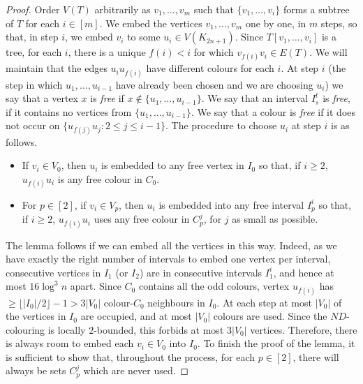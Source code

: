 \documentclass{article}
\theoremstyle{definition}
\begin{document}
\begin{proof}
Order $V(T)$ arbitrarily as $v_1, \dots, v_{m}$ such that $\{v_1, \dots, v_i\}$ forms a subtree of $T$ for each $i\in [m]$.
We embed the vertices $v_1, \dots, v_{m}$ one by one, in $m$ steps, so that, in step $i$, we embed $v_i$ to some $u_i\in V(K_{2n+1})$. Since $T[v_1, \dots, v_i]$ is a tree, for each $i$, there is a unique $f(i)<i$ for which $v_{f(i)}v_i\in E(T)$. We will maintain that the edges $u_iu_{f(i)}$ have different colours for each $i$.
At step $i$ (the step in which $u_1, \dots, u_{i-1}$ have already been chosen and we are choosing $u_i$) we say that a vertex $x$ is \emph{free} if $x\not\in\{u_1, \dots, u_{i-1}\}$. We say that an interval $I_s^t$ is \emph{free}, if it contains no vertices from $\{u_1, \dots, u_{i-1}\}$. We say that a colour is \emph{free} if it does not occur on $\{u_{f(j)}u_j:2\leq j\leq i-1\}$. The procedure to choose $u_i$ at step $i$ is as follows.
\begin{itemize}
\item If $v_i\in V_0$, then $u_i$ is embedded to any free vertex in $I_0$ so that, if $i\geq 2$, $u_{f(i)}u_i$ is any free colour in $C_0$.
\item For $p\in [2]$, if $v_i\in V_p$, then $u_i$ is embedded into any free interval $I_p^i$ so that, if $i\geq 2$, $u_{f(i)}u_i$ uses any free colour in $C_p^j$, for $j$ as small as possible.
\end{itemize}
The lemma follows if we can embed all the vertices in this way. Indeed, as we have exactly the right number of intervals to embed one vertex per interval, consecutive vertices in $I_1$ (or $I_2$) are in consecutive intervals $I_1^i$, and hence at most $16\log^3n$ apart. Since $C_0$ contains all the odd colours,
vertex $u_{f(i)}$ has $\geq \lfloor |I_0|/2\rfloor-1 > 3|V_0|$ colour-$C_0$ neighbours in $I_0$. At each step at most $|V_0|$ of the vertices in $I_0$ are occupied, and at most $|V_0|$ colours are used. Since the $ND$-colouring is locally $2$-bounded,
this forbids at most $3|V_0|$ vertices. Therefore, there is always room to embed each $v_i \in V_0$ into $I_0$.
To finish the proof of the lemma, it is sufficient to show that, throughout the process, for each $p\in [2]$, there will always be sets $C_p^j$ which are never used.


\end{proof}
\end{document}

